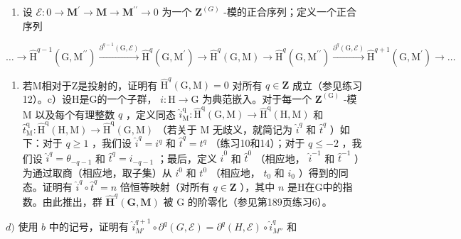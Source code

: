 \begin{enumerate}
\def\labelenumi{\alph{enumi})}
\tightlist
\item
  设 \(\mathcal{E}:0\to\mathbf{M}^{\prime}\to\mathbf{M}\to\mathbf{M}^{\prime\prime}\to0\) 为一个 \(\mathbf{Z}^{(G)}\) -模的正合序列；定义一个正合序列
\end{enumerate}

\[
\dots \rightarrow \hat {\mathrm{H}} ^ {q - 1} (\mathrm{G}, \mathrm{M} ^ {\prime \prime}) \xrightarrow {\partial^ {q - 1} (\mathrm{G} , \mathcal {E})} \hat {\mathrm{H}} ^ {q} (\mathrm{G}, \mathrm{M} ^ {\prime}) \rightarrow \hat {\mathrm{H}} ^ {q} (\mathrm{G}, \mathrm{M}) \rightarrow \hat {\mathrm{H}} ^ {q} (\mathrm{G}, \mathrm{M} ^ {\prime \prime}) \xrightarrow {\partial^ {q} (\mathrm{G} , \mathcal {E})} \hat {\mathrm{H}} ^ {q + 1} (\mathrm{G}, \mathrm{M} ^ {\prime}) \rightarrow \dots
\]

\begin{enumerate}
\def\labelenumi{\alph{enumi})}
\setcounter{enumi}{1}
\tightlist
\item
  若M相对于Z是投射的，证明有 \(\hat{\mathrm{H}}^{q}(\mathrm{G},\mathrm{M}) = 0\) 对所有 \(q\in \mathbf{Z}\) 成立（参见练习12）。c）设H是G的一个子群， \(i:\mathrm{H}\to \mathrm{G}\) 为典范嵌入。对于每一个 \(\mathbf{Z}^{(\mathrm{G})}\) -模 M 以及每个有理整数 \(q\) ，定义同态 \(\hat{i}_{\mathrm{M}}^{\mathrm{q}}:\hat{\mathrm{H}}^{\mathrm{q}}(\mathrm{G},\mathrm{M})\rightarrow \hat{\mathrm{H}}^{\mathrm{q}}(\mathrm{H},\mathrm{M})\) 和 \(\hat{t}_{\mathrm{M}}^{\mathrm{q}}:\hat{\mathrm{H}}^{\mathrm{q}}(\mathrm{H},\mathrm{M})\rightarrow \hat{\mathrm{H}}^{\mathrm{q}}(\mathrm{G},\mathrm{M})\) （若关于 M 无歧义，就简记为 \(\hat{i}^q\) 和 \(\hat{t}^q\) ）如下：对于 \(q\geqslant 1\) ，我们设 \(\hat{i}^q = i^q\) 和 \(\hat{t}^q = t^q\) （练习10和14）；对于 \(q\leqslant -2\) ，我们设 \(\hat{i}^q = \theta_{-q - 1}\) 和 \(\hat{t}^q = i_{-q - 1}\) ；最后，定义 \(\hat{i}^0\) 和 \(\hat{t}^0\) （相应地， \(\hat{i}^{-1}\) 和 \(\hat{t}^{-1}\) ）为通过取商（相应地，取子集）从 \(i^0\) 和 \(t^0\) （相应地， \(t_0\) 和 \(i_0\) ）得到的同态。证明有 \(\hat{i}^q\circ \hat{t}^q = n\) 倍恒等映射（对所有 \(q\in \mathbf{Z}\) ），其中 \(n\) 是H在G中的指数。由此推出，群 \(\hat{\mathbf{H}}^{q}(\mathbf{G},\mathbf{M})\) 被 G 的阶零化（参见第189页练习6）。
\end{enumerate}

\(d)\) 使用 \(b\) 中的记号，证明有 \(\hat{i}_{M'}^{q+1} \circ \partial^q(G, \mathcal{E}) = \partial^q(H, \mathcal{E}) \circ \hat{i}_{M''}^q\) 和

